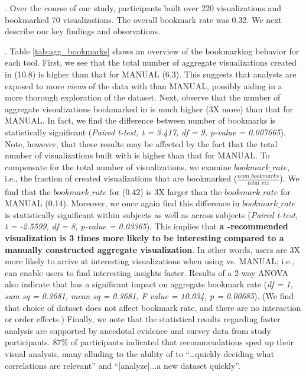 .
Over the course of our study, participants built over 220 visualizations 
and bookmarked 70 visualizations.
The overall bookmark rate was 0.32.
We next describe our key findings and observations.

.
Table \ref{tab:agg_bookmarks} shows an overview of the bookmarking behavior for each tool.
First, we see that the total number of aggregate visualizations created in \SeeDB (10.8) is higher
than that for MANUAL (6.3).
This suggests that analysts are exposed to more {\em views} of the data with \SeeDB than MANUAL, possibly
aiding in a more thorough exploration of the dataset.
Next, observe that the number of aggregate visualizations bookmarked in \SeeDB is much higher (3X more)
than that for MANUAL.
In fact, we find the difference between number of bookmarks is statistically significant ({\em Paired t-test,
t = 3.417, df = 9, p-value = 0.007665}).
Note, however, that these results may be affected by the fact that the total number of visualizations
built with \SeeDB is higher than that for MANUAL.
To compensate for the total number of visualizations, we examine $bookmark\_rate$, i.e., the fraction of
created visualizations that are bookmarked ($\frac{num\_bookmarks}{total\_viz}$).
We find that the $bookmark\_rate$ for \SeeDB (0.42) is 3X larger than the $bookmark\_rate$ for 
MANUAL (0.14).
Moreover, we once again find this difference in $bookmark\_rate$ is statistically significant
within subjects as well as across subjects ({\em Paired t-test, t = -2.5599, df = 8, p-value = 0.03365}).
This implies that {\bf a \SeeDB-recommended visualization is 3 times more likely to be
interesting compared to a manually constructed aggregate visualization}.
In other words, users are 3X more likely to arrive at interesting visualizations when using
\SeeDB vs. MANUAL; i.e., \SeeDB can enable users to find interesting insights faster.
Results of a 2-way ANOVA also indicate that \SeeDB has a significant impact on 
aggregate bookmark rate ({\em df = 1, sum sq = 0.3681, mean sq = 0.3681, F value = 10.034, p = 0.00685}). 
(We find that choice of dataset does not affect bookmark rate, and there are no interaction or order effects.)
Finally, we note that the statistical results regarding faster analysis are supported by anecdotal evidence 
and survey data from study participants.
87\% of participants indicated that \SeeDB recommendations sped up their visual analysis, many alluding
to the ability of \SeeDB to ``\ldots quickly deciding what correlations are relevant'' and 
``[analyze]...a new dataset quickly''.

